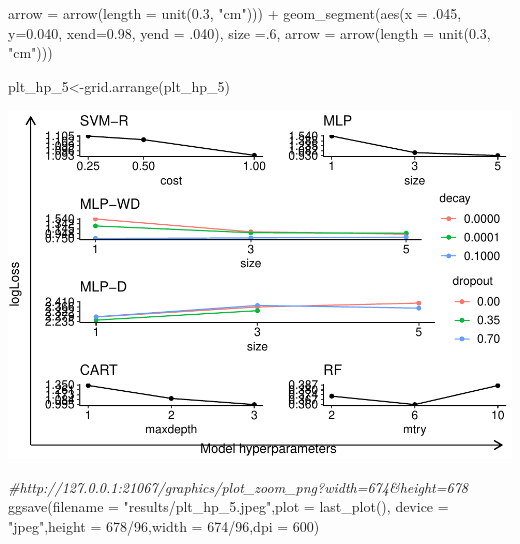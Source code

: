 \documentclass[
]{article}
\newenvironment{Shaded}{\begin{snugshade}}{\end{snugshade}}
\newcommand{\AttributeTok}[1]{\textcolor[rgb]{0.77,0.63,0.00}{#1}}
\newcommand{\CommentTok}[1]{\textcolor[rgb]{0.56,0.35,0.01}{\textit{#1}}}
\newcommand{\DecValTok}[1]{\textcolor[rgb]{0.00,0.00,0.81}{#1}}
\newcommand{\FloatTok}[1]{\textcolor[rgb]{0.00,0.00,0.81}{#1}}
\newcommand{\FunctionTok}[1]{\textcolor[rgb]{0.00,0.00,0.00}{#1}}
\newcommand{\NormalTok}[1]{#1}
\newcommand{\OtherTok}[1]{\textcolor[rgb]{0.56,0.35,0.01}{#1}}
\newcommand{\SpecialCharTok}[1]{\textcolor[rgb]{0.00,0.00,0.00}{#1}}
\newcommand{\StringTok}[1]{\textcolor[rgb]{0.31,0.60,0.02}{#1}}
\begin{document}
\begin{Shaded}
\begin{Highlighting}[]
               \AttributeTok{arrow =} \FunctionTok{arrow}\NormalTok{(}\AttributeTok{length =} \FunctionTok{unit}\NormalTok{(}\FloatTok{0.3}\NormalTok{, }\StringTok{"cm"}\NormalTok{))) }\SpecialCharTok{+}
  \FunctionTok{geom\_segment}\NormalTok{(}\FunctionTok{aes}\NormalTok{(}\AttributeTok{x =}\NormalTok{ .}\DecValTok{045}\NormalTok{, }\AttributeTok{y=}\FloatTok{0.040}\NormalTok{, }\AttributeTok{xend=}\FloatTok{0.98}\NormalTok{, }\AttributeTok{yend =}\NormalTok{ .}\DecValTok{040}\NormalTok{), }\AttributeTok{size =}\NormalTok{.}\DecValTok{6}\NormalTok{,}
               \AttributeTok{arrow =} \FunctionTok{arrow}\NormalTok{(}\AttributeTok{length =} \FunctionTok{unit}\NormalTok{(}\FloatTok{0.3}\NormalTok{, }\StringTok{"cm"}\NormalTok{)))}

\NormalTok{plt\_hp\_5}\OtherTok{\textless{}{-}}\FunctionTok{grid.arrange}\NormalTok{(plt\_hp\_5)}
\end{Highlighting}
\end{Shaded}

\includegraphics{sl-inf-cairs-2301_files/figure-latex/optResults2-2.pdf}

\begin{Shaded}
\begin{Highlighting}[]
\CommentTok{\#http://127.0.0.1:21067/graphics/plot\_zoom\_png?width=674\&height=678}
\FunctionTok{ggsave}\NormalTok{(}\AttributeTok{filename =} \StringTok{"results/plt\_hp\_5.jpeg"}\NormalTok{,}\AttributeTok{plot =} \FunctionTok{last\_plot}\NormalTok{(),}
       \AttributeTok{device =} \StringTok{"jpeg"}\NormalTok{,}\AttributeTok{height =} \DecValTok{678}\SpecialCharTok{/}\DecValTok{96}\NormalTok{,}\AttributeTok{width =} \DecValTok{674}\SpecialCharTok{/}\DecValTok{96}\NormalTok{,}\AttributeTok{dpi =} \DecValTok{600}\NormalTok{)}
\end{Highlighting}
\end{Shaded}
\end{document}
